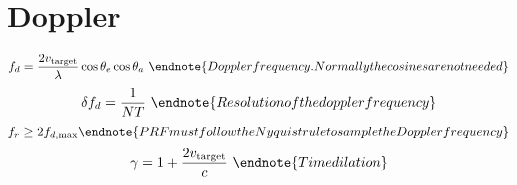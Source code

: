 \section{Doppler}
\begin{multicols}{3} \noindent
	$$f_d = \frac{2 v_\text{target}}{\lambda} \cos{\theta_e} \cos{\theta_a} \
		\endnote{Doppler frequency. Normally the cosines are not needed}
		$$
	$$\delta f_d = \frac{1}{NT} \
		\endnote{Resolution of the doppler frequency}
		$$
	$$ f_r \ge 2 f_{d, \text{max}}
		\endnote{PRF must follow the Nyquist rule to sample the Doppler frequency}
		$$
	$$ \gamma = 1 + \frac{2v_\text{target}}{c} \
		\endnote{Time dilation}
	$$
\end{multicols}
\printendnotes[itemize]
